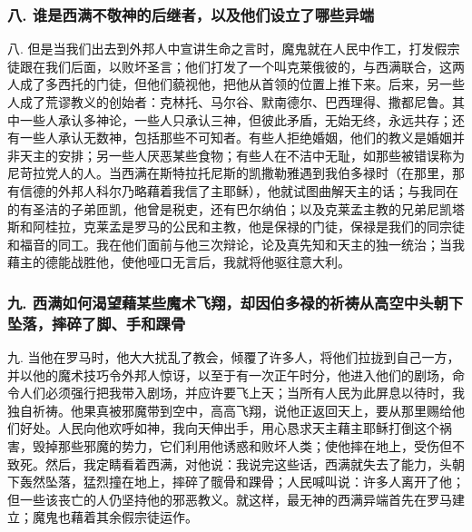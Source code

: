 
\subsubsection{八. 谁是西满不敬神的后继者，以及他们设立了哪些异端}

八. 但是当我们出去到外邦人中宣讲生命之言时，魔鬼就在人民中作工，打发假宗徒跟在我们后面，以败坏圣言；他们打发了一个叫克莱俄彼的，与西满联合，这两人成了多西托的门徒，但他们藐视他，把他从首领的位置上推下来。后来，另一些人成了荒谬教义的创始者：克林托、马尔谷、默南德尔、巴西理得、撒都尼鲁。其中一些人承认多神论，一些人只承认三神，但彼此矛盾，无始无终，永远共存；还有一些人承认无数神，包括那些不可知者。有些人拒绝婚姻，他们的教义是婚姻并非天主的安排；另一些人厌恶某些食物；有些人在不洁中无耻，如那些被错误称为尼苛拉党人的人。当西满在斯特拉托尼斯的凯撒勒雅遇到我伯多禄时（在那里，那有信德的外邦人科尔乃略藉着我信了主耶稣），他就试图曲解天主的话；与我同在的有圣洁的子弟匝凯，他曾是税吏，还有巴尔纳伯；以及克莱孟主教的兄弟尼凯塔斯和阿桂拉，克莱孟是罗马的公民和主教，他是保禄的门徒，保禄是我们的同宗徒和福音的同工。我在他们面前与他三次辩论，论及真先知和天主的独一统治；当我藉主的德能战胜他，使他哑口无言后，我就将他驱往意大利。\par


\subsubsection{九. 西满如何渴望藉某些魔术飞翔，却因伯多禄的祈祷从高空中头朝下坠落，摔碎了脚、手和踝骨}

九. 当他在罗马时，他大大扰乱了教会，倾覆了许多人，将他们拉拢到自己一方，并以他的魔术技巧令外邦人惊讶，以至于有一次正午时分，他进入他们的剧场，命令人们必须强行把我带入剧场，并应许要飞上天；当所有人民为此屏息以待时，我独自祈祷。他果真被邪魔带到空中，高高飞翔，说他正返回天上，要从那里赐给他们好处。人民向他欢呼如神，我向天伸出手，用心恳求天主藉主耶稣打倒这个祸害，毁掉那些邪魔的势力，它们利用他诱惑和败坏人类；使他摔在地上，受伤但不致死。然后，我定睛看着西满，对他说：我说完这些话，西满就失去了能力，头朝下轰然坠落，猛烈撞在地上，摔碎了髋骨和踝骨；人民喊叫说：许多人离开了他；但一些该丧亡的人仍坚持他的邪恶教义。就这样，最无神的西满异端首先在罗马建立；魔鬼也藉着其余假宗徒运作。\par

